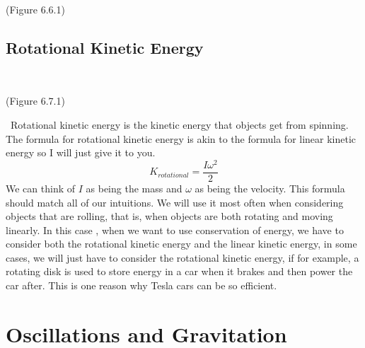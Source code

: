 \documentclass{article}[gray]
\numberwithin{equation}{subsection}
\begin{document}
\newline
\newline
{}
\newline
\newline
\begin{center}
(Figure 6.6.1)
\end{center}
\subsection{Rotational Kinetic Energy} 
\  
\
\begin{center}
(Figure 6.7.1)
\end{center}
\
Rotational kinetic energy is the kinetic energy that objects get from spinning. The formula for rotational kinetic energy is akin to the formula for linear kinetic energy so I will just give it to you. \begin{equation}K_{rotational}=\frac{I\omega^2}{2}\end{equation} We can think of $I$ as being the mass and $\omega$ as being the velocity. This formula should match all of our intuitions. We will use it most often when considering objects that are rolling, that is, when objects are both rotating and moving linearly. In this case , when we want to use conservation of energy, we have to consider both the rotational kinetic energy and the linear kinetic energy, in some cases, we will just have to consider the rotational kinetic energy, if for example, a rotating disk is used to store energy in a car when it brakes and then power the car after. This is one reason why Tesla cars can be so efficient.

\section{Oscillations and Gravitation}
\end{document}
